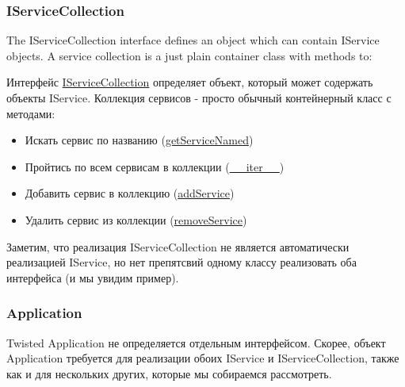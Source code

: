 \subsubsection{IServiceCollection}

The IServiceCollection interface defines an object which can contain IService objects. A service collection is a just plain container class with methods to:


Интерфейс \href{http://twistedmatrix.com/trac/browser/tags/releases/twisted-10.0.0/twisted/application/service.py#L203}{IServiceCollection} определяет объект, который 
может содержать объекты IService. Коллекция сервисов - просто 
обычный контейнерный класс с методами:

\begin{itemize}

\item Искать сервис по названию (\href{http://twistedmatrix.com/trac/browser/tags/releases/twisted-10.0.0/twisted/application/service.py#L212}{getServiceNamed})

\item Пройтись по всем сервисам в коллекции (\href{http://twistedmatrix.com/trac/browser/tags/releases/twisted-10.0.0/twisted/application/service.py#L222}{\_\_iter\_\_})

\item Добавить сервис в коллекцию (\href{http://twistedmatrix.com/trac/browser/tags/releases/twisted-10.0.0/twisted/application/service.py#L227}{addService})

\item Удалить сервис из коллекции (\href{http://twistedmatrix.com/trac/browser/tags/releases/twisted-10.0.0/twisted/application/service.py#L236}{removeService})

\end{itemize}


Заметим, что реализация IServiceCollection не 
является автоматически реализацией IService, 
но нет препятсвий одному классу реализовать 
оба интерфейса (и мы увидим пример).


\subsubsection{Application}

Twisted Application не определяется отдельным интерфейсом. 
Скорее, объект Application требуется для реализации обоих 
IService и IServiceCollection, также как и для нескольких других, 
которые мы собираемся рассмотреть. 


